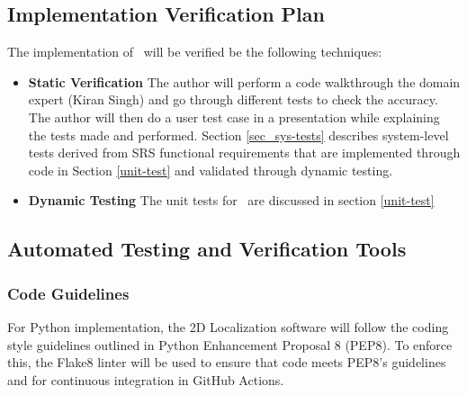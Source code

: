 \documentclass[12pt, titlepage]{article}
\begin{document}


\subsection{Implementation Verification Plan}\label{plan_implement}

The implementation of \progname~will be verified be the following techniques:
\begin{itemize}
  \item \textbf{Static Verification}
  \newline  
    The author will perform a code walkthrough the domain expert (Kiran Singh) and go through different tests to check the accuracy. The author will then do a user test case in a presentation while explaining the tests made and performed. Section \ref{sec_sys-tests} describes system-level tests derived from SRS functional requirements that are implemented through code in Section \ref{unit-test} and validated through dynamic testing.

  \item \textbf{Dynamic Testing}
  \newline
  The unit tests for \progname~are discussed in section \ref{unit-test} 

\end{itemize}




\subsection{Automated Testing and Verification Tools}\label{plan_auto}

\subsubsection{Code Guidelines}
For Python implementation, the 2D Localization software will follow the coding style guidelines outlined in Python Enhancement Proposal 8 (PEP8). To enforce this, the Flake8 linter will be used to ensure that code meets PEP8's guidelines and for continuous integration in GitHub Actions.
\end{document}
